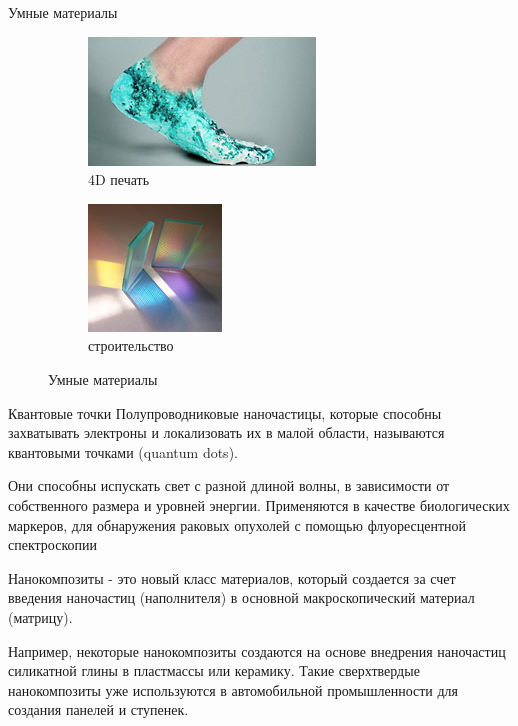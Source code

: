 \documentclass[_Venture_p3.tex]{subfiles}
\begin{document}
\begin{frame}{Умные материалы}
\begin{figure}	
	\centering
	\begin{subfigure}[t]{4.2cm}
		\centering
		\includegraphics[scale=0.95]{img/smart_materials_c.png}
		\caption{4D печать}\label{fig:a}	
	\end{subfigure}
	\quad
	\begin{subfigure}[t]{4.2cm}
		\centering
		\includegraphics[scale=0.95]{img/smart_materials_d.png}
		\caption{строительство}\label{fig:b}
	\end{subfigure}
	\caption{Умные материалы}\label{fig:smart_materials1}
\end{figure}
\end{frame}

\begin{frame}{Квантовые точки}
Полупроводниковые наночастицы, которые способны захватывать электроны и локализовать их в малой области, называются квантовыми точками (quantum dots). 

Они способны испускать свет с разной длиной волны, в зависимости от собственного размера и уровней энергии. Применяются в качестве биологических маркеров, для обнаружения раковых опухолей с помощью флуоресцентной спектроскопии

\end{frame}

\begin{frame}{Нанокомпозиты}
- это новый класс материалов, который создается за счет введения наночастиц (наполнителя) в основной макроскопический материал (матрицу).

Например, некоторые нанокомпозиты создаются на основе внедрения наночастиц силикатной глины в пластмассы или керамику. Такие сверхтвердые нанокомпозиты уже используются в автомобильной промышленности для создания панелей и ступенек.

\end{frame}
\end{document}
